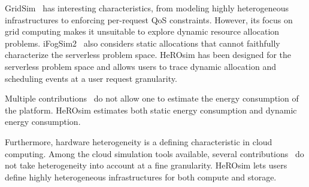 
GridSim~\cite{buyyaGridSimToolkitModeling2002} has interesting characteristics, from modeling highly heterogeneous infrastructures to enforcing per-request QoS constraints. However, its focus on grid computing makes it unsuitable to explore dynamic resource allocation problems. iFogSim2~\cite{mahmudIFogSim2ExtendedIFogSim2021} also considers static allocations that cannot faithfully characterize the serverless problem space. HeROsim has been designed for the serverless problem space and allows users to trace dynamic allocation and scheduling events at a user request granularity.

Multiple contributions~\cite{jeonCloudSimExtensionSimulatingDistributed2019, cai_elasticsim_2017, buyyaGridSimToolkitModeling2002, nunez_icancloud_2012} do not allow one to estimate the energy consumption of the platform. 
HeROsim estimates both static energy consumption and dynamic energy consumption.

Furthermore, hardware heterogeneity is a defining characteristic in cloud computing. %
Among the cloud simulation tools available, several contributions~\cite{jeonCloudSimExtensionSimulatingDistributed2019, cai_elasticsim_2017, nunez_icancloud_2012, mahmoudiSimFaaSPerformanceSimulator2021} do not take heterogeneity into account at a fine granularity. HeROsim lets users define highly heterogeneous infrastructures for both compute and storage.

